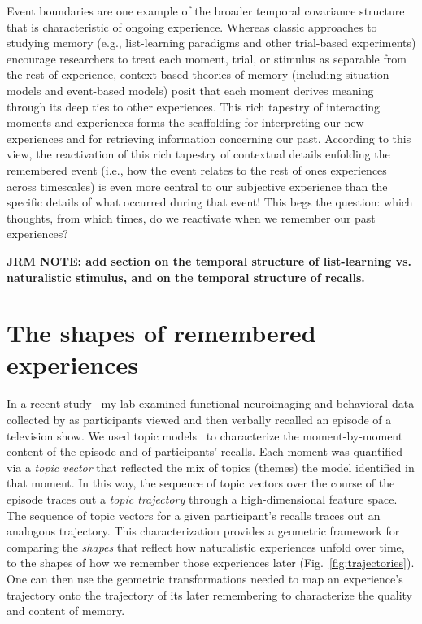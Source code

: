 \documentclass{article}
\begin{document}
Event boundaries are one example of the broader temporal covariance structure that is characteristic of ongoing experience.  Whereas classic approaches to studying memory (e.g., list-learning paradigms and other trial-based experiments) encourage researchers to treat each moment, trial, or stimulus as separable from the rest of experience, context-based theories of memory (including situation models and event-based models) posit that each moment derives meaning through its deep ties to other experiences.  This rich tapestry of interacting moments and experiences forms the scaffolding for interpreting our new experiences and for retrieving information concerning our past.  According to this view, the reactivation of this rich tapestry of contextual details enfolding the remembered event (i.e., how the event relates to the rest of ones experiences across timescales) is even more central to our subjective experience than the specific details of what occurred during that event!  This begs the question: which thoughts, from which times, do we reactivate when we remember our past experiences?

\textbf{JRM NOTE: add section on the temporal structure of list-learning vs. naturalistic stimulus, and on the temporal structure of recalls.}

\section*{The shapes of remembered experiences}
In a recent study~\citep{HeusEtal18c} my lab examined functional neuroimaging and behavioral data collected by \cite{ChenEtal17} as participants viewed and then verbally recalled an episode of a television show.  We used topic models~\citep{BleiEtal03} to characterize the moment-by-moment content of the episode and of participants' recalls.  Each moment was quantified via a \textit{topic vector} that reflected the mix of topics (themes) the model identified in that moment.  In this way, the sequence of topic vectors over the course of the episode traces out a \textit{topic trajectory} through a high-dimensional feature space.  The sequence of topic vectors for a given participant's recalls traces out an analogous trajectory.  This characterization provides a geometric framework for comparing the \textit{shapes} that reflect how naturalistic experiences unfold over time, to the shapes of how we remember those experiences later (Fig.~\ref{fig:trajectories}).  One can then use the geometric transformations needed to map an experience's trajectory onto the trajectory of its later remembering to characterize the quality and content of memory.
\end{document}
